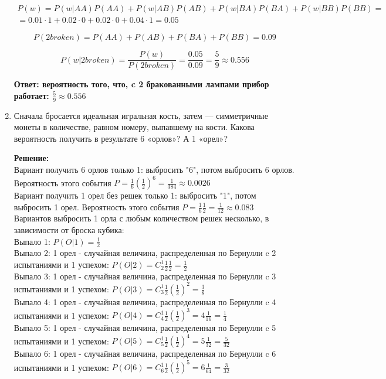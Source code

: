 \documentclass[a4paper,12pt]{article}
\begin{document}
\begin{enumerate}
\begin{align*}P(w)=P(w|AA)P(AA)+P(w|AB)P(AB)+P(w|BA)P(BA)+P(w|BB)P(BB)=\\=0.01\cdot1+0.02\cdot0+0.02\cdot0+0.04\cdot1=0.05\end{align*}

$$P(2broken)= P(AA)+P(AB)+P(BA)+P(BB)=0.09$$

$$P(w|2broken)= \frac{P(w)}{P(2broken)}=\frac{0.05}{0.09}=\frac{5}{9} \approx 0.556$$

\textbf{Ответ: вероятность того, что, c 2 бракованными лампами прибор работает: $\frac{5}{9} \approx 0.556$ }





\item Сначала бросается идеальная игральная кость, затем — симметричные монеты в количестве, равном номеру, выпавшему на кости. Какова вероятность получить в результате 6 «орлов»? А 1 «орел»? 

\textbf{Решение:}\\
Вариант получить 6 орлов только 1: выбросить "6", потом выбросить 6 орлов. Вероятность этого события $P = \frac{1}{6}(\frac{1}{2})^6=\frac{1}{384}\approx0.0026$\\
Вариант получить 1 орел без решек только 1: выбросить "1", потом выбросить 1 орел. Вероятность этого события $P = \frac{1}{6}\frac{1}{2}=\frac{1}{12}\approx0.083$\\

Вариантов выбросить 1 орла с любым количеством решек несколько, в зависимости от броска кубика:\\
Выпало 1: $P(O|1) = \frac{1}{2}$\\
Выпало 2: 1 орел - случайная величина, распределенная по Бернулли c 2 испытаниями и 1 успехом: $P(O|2) = C^1_2 \frac{1}{2} \frac{1}{2} = \frac{1}{2}$\\
Выпало 3: 1 орел - случайная величина, распределенная по Бернулли c 3 испытаниями и 1 успехом: $P(O|3) = C^1_3 \frac{1}{2} {(\frac{1}{2})}^2 = \frac{3}{8}$\\
Выпало 4: 1 орел - случайная величина, распределенная по Бернулли c 4 испытаниями и 1 успехом: $P(O|4) = C^1_4 \frac{1}{2} {(\frac{1}{2})}^3 = 4\frac{1}{16}=\frac{1}{4}$\\
Выпало 5: 1 орел - случайная величина, распределенная по Бернулли c 5 испытаниями и 1 успехом: $P(O|5) = C^1_5 \frac{1}{2} {(\frac{1}{2})}^4 = 5\frac{1}{32}=\frac{5}{32}$\\
Выпало 6: 1 орел - случайная величина, распределенная по Бернулли c 6 испытаниями и 1 успехом: $P(O|6) = C^1_6 \frac{1}{2} {(\frac{1}{2})}^5 = 6\frac{1}{64}=\frac{3}{32}$\\


\end{enumerate}
\end{document}

